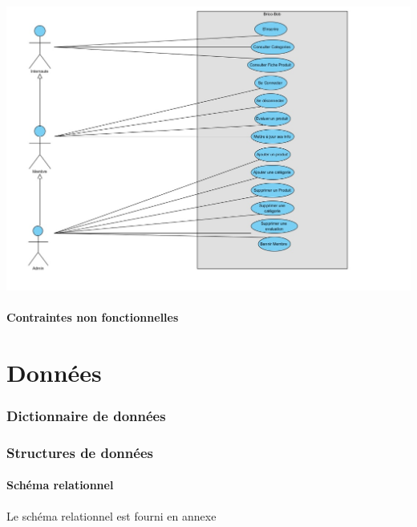 \documentclass[10pt,a4paper]{article}
\begin{document}
				\includegraphics[scale=0.5]{cas/diagramme.jpg}
			\subsection{Contraintes non fonctionnelles}
				
	\newpage			
	\part{Données}
		\section{Dictionnaire de données}
			
		\section{Structures de données}
			\subsection{Schéma relationnel}
				Le schéma relationnel est fourni en annexe
				\newline
					
\end{document}
